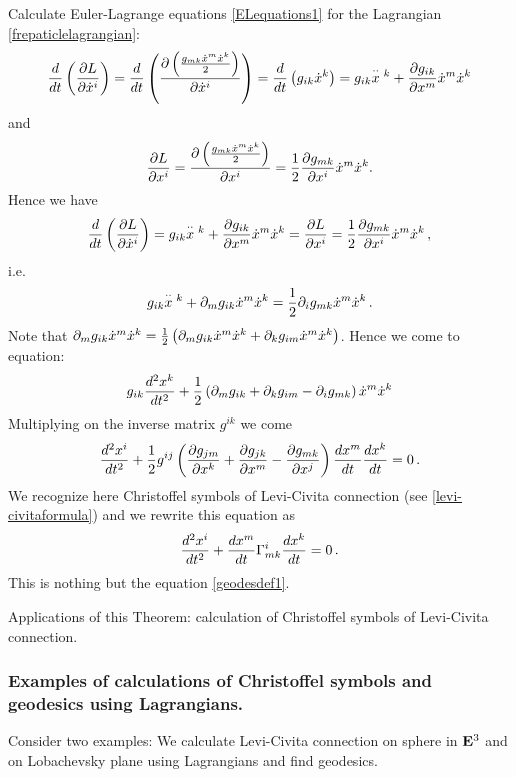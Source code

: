 \documentclass[12pt]{article}
\theoremstyle{theorem}
\numberwithin{equation}{section}
\begin{document}
{Calculate Euler-Lagrange equations \eqref{ELequations1} for the Lagrangian \eqref{frepaticlelagrangian}:
               $$
    {d\over dt}\left({\p L\over \p \dot x^i}\right)=
    {d\over dt}\left({\p \left({g_{mk}\dot x^m\dot x^k\over 2}\right)\over \p \dot x^i}\right)=
     {d\over dt}\left(g_{ik}\dot x^k\right)=
    g_{ik}{\buildrel \cdot\cdot\over x{^k}}+{\p g_{ik}\over \p x^m}\dot x^m\dot x^k
               $$
and
            $$
            {\partial L\over \partial  x^i}={\partial \left({g_{mk}\dot x^m\dot x^k\over 2}\right)\over \partial  x^i}=
            {1\over 2}{\partial g_{mk}\over \partial x^i}\dot x^m\dot x^k.
            $$
Hence we have
           $$
 {d\over dt}\left({\p L\over \p \dot x^i}\right)=
 g_{ik}{\buildrel \cdot\cdot\over x{^k}}+{\p g_{ik}\over \p x^m}\dot x^m\dot x^k=
    {\p L\over \p  x^i}={1\over 2}{\p g_{mk}\over \p x^i}\dot x^m\dot x^k\,,
           $$
  i.e.
       $$
 g_{ik}{\buildrel \cdot\cdot\over x{^k}}+\p_mg_{ik}\dot x^m\dot x^k=
 {1\over 2}\p_i g_{mk}\dot x^m\dot x^k\,.
       $$
 Note that    $\partial_mg_{ik}\dot x^m\dot x^k={1\over 2}\left(\partial_mg_{ik}\dot x^m\dot x^k+\partial_kg_{im}\dot x^m\dot x^k\right)$.
Hence we come to equation:
               $$
               g_{ik}{d^2 x^k\over dt^2}+
               {1\over 2}\left(
 \partial_mg_{ik}+\partial_kg_{im}-\partial_ig_{mk}
                  \right)\dot x^m\dot x^k
               $$
 Multiplying on the inverse matrix $g^{ik}$ we come
\begin{equation}\label{ELequationforgeodesic1}
    {d^2 x^i\over dt^2}+{1\over 2}g^{ij}\left({\partial g_{jm}\over\partial x^k}+
    {\partial g_{jk}\over\partial x^m}-{\partial g_{mk}\over \partial x^j}\right){dx^m\over dt}{dx^k\over dt}=0\,.
\end{equation}
We recognize here Christoffel symbols of Levi-Civita connection (see \eqref{levi-civitaformula}) and we rewrite
this equation as
   \begin{equation}\label{ELequationforgeodesic2}
    {d^2 x^i\over dt^2}+{dx^m\over dt}\Gamma^i_{mk}{dx^k\over dt}=0\,.
\end{equation}
This is nothing but the equation \eqref{geodesdef1}.

Applications of this Theorem: calculation of Christoffel symbols of Levi-Civita connection.

\subsubsection{Examples of calculations of Christoffel symbols and geodesics using Lagrangians.}

Consider two examples: We calculate Levi-Civita connection on sphere in ${\bf E}^3$ and on Lobachevsky plane
using Lagrangians and find geodesics.

}
\end{document}
